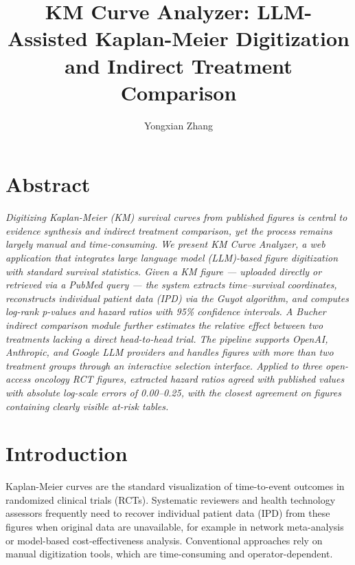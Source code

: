\documentclass{amia}
\begin{document}
\title{KM Curve Analyzer: LLM-Assisted Kaplan-Meier Digitization\\
       and Indirect Treatment Comparison}

\author{Yongxian Zhang}


\maketitle

\section*{Abstract}

\textit{Digitizing Kaplan-Meier (KM) survival curves from published figures is
central to evidence synthesis and indirect treatment comparison, yet the process
remains largely manual and time-consuming. We present KM Curve Analyzer, a
web application that integrates large language model (LLM)-based figure
digitization with standard survival statistics. Given a KM figure --- uploaded
directly or retrieved via a PubMed query --- the system extracts
time--survival coordinates, reconstructs individual patient data (IPD) via the
Guyot algorithm, and computes log-rank p-values and hazard ratios with 95\%
confidence intervals. A Bucher indirect comparison module further estimates
the relative effect between two treatments lacking a direct head-to-head
trial. The pipeline supports OpenAI, Anthropic, and Google LLM providers and
handles figures with more than two treatment groups through an interactive
selection interface. Applied to three open-access oncology RCT figures, extracted hazard
ratios agreed with published values with absolute log-scale errors
of 0.00--0.25, with the closest agreement on figures containing
clearly visible at-risk tables.}

\section*{Introduction}

Kaplan-Meier curves are the standard visualization of time-to-event outcomes
in randomized clinical trials (RCTs)\cite{kaplan1958}. Systematic reviewers
and health technology assessors frequently need to recover individual patient
data (IPD) from these figures when original data are unavailable, for example
in network meta-analysis or model-based cost-effectiveness analysis.
Conventional approaches rely on manual digitization tools, which are
time-consuming and operator-dependent\cite{tierney2007}.
\end{document}
